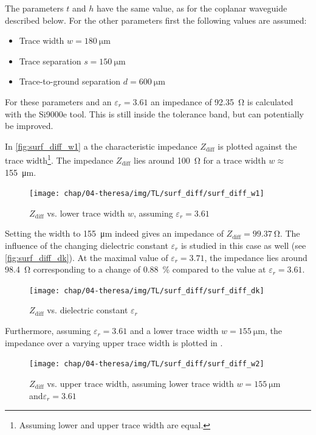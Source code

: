 The parameters $t$ and $h$ have the same value, as for the coplanar waveguide described below.
For the other parameters first the following values are assumed:
\begin{itemize}
	\item Trace width $w = \SI{180}{\micro \meter}$ 
	\item Trace separation $s = \SI{150}{\micro \meter}$
	\item Trace-to-ground separation $d = \SI{600}{\micro \meter}$
\end{itemize}
For these parameters and an $\varepsilon_r = 3.61$ an impedance of \SI{92.35}{\ohm} is calculated with the Si9000e tool.
This is still inside the tolerance band, but can potentially be improved.

In \autoref{fig:surf_diff_w1} a the characteristic impedance $Z_\text{diff}$ is plotted against the trace width\footnote{Assuming lower and upper trace width are equal.}. 
The impedance $Z_\text{diff}$ lies around \SI{100}{\ohm} for a trace width $w \approx$\SI{155}{\micro \meter}.

\begin{figure}[tbh]
	\centering
	\texttt{[image: chap/04-theresa/img/TL/surf\_diff/surf\_diff\_w1]}
	\caption[DCWG, $Z_\text{diff}$ vs. $w$]{$Z_\text{diff}$ vs. lower trace width $w$, assuming $\varepsilon_r = 3.61$}
	\label{fig:surf_diff_w1}
\end{figure}
Setting the width to \SI{155}{\micro \meter} indeed gives an impedance of $Z_\text{diff} = \SI{99.37}{\ohm}$.
The influence of the changing dielectric constant $\varepsilon_r$ is studied in this case as well (see \autoref{fig:surf_diff_dk}). 
At the maximal value of $\varepsilon_r = 3.71$, the impedance lies around \SI{98.4}{\ohm} corresponding to a change of \SI{0.88}{\percent} compared to the value at $\varepsilon_r = 3.61$. 
\begin{figure}[tbh]
	\centering
	\texttt{[image: chap/04-theresa/img/TL/surf\_diff/surf\_diff\_dk]}
	\caption[DCWG, $Z_\text{diff}$ vs. $\varepsilon_r$]{$Z_\text{diff}$ vs. dielectric constant $\varepsilon_r$}
	\label{fig:surf_diff_dk}
\end{figure}


Furthermore, assuming $\varepsilon_r = 3.61$ and a lower trace width $w = \SI{155}{\micro \meter}$, the impedance over a varying upper trace width is plotted in .


\begin{figure}[tbh]
	\centering
	\texttt{[image: chap/04-theresa/img/TL/surf\_diff/surf\_diff\_w2]}
	\caption[DCWG, $Z_\text{diff}$ vs. upper trace width]{$Z_\text{diff}$ vs. upper trace width, assuming lower trace width $w = \SI{155}{\micro \meter}$ and$\varepsilon_r = 3.61$}
	\label{fig:surf_diff_w2}
\end{figure}

